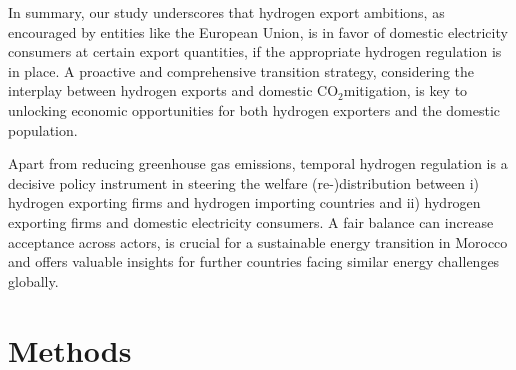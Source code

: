 \documentclass[5p,numafflabel]{elsarticle}
\newcommand{\co}{\ce{CO2}~}
\def\co{CO${}_2${\:}}
\begin{document}
In summary, our study underscores that hydrogen export ambitions, as encouraged by entities like the European Union, is in favor of domestic electricity consumers at certain export quantities, if the appropriate hydrogen regulation is in place. A proactive and comprehensive transition strategy, considering the interplay between hydrogen exports and domestic \co mitigation, is key to unlocking economic opportunities for both hydrogen exporters and the domestic population. 


Apart from reducing greenhouse gas emissions, temporal hydrogen regulation is a decisive policy instrument in steering the welfare (re-)distribution between i) hydrogen exporting firms and hydrogen importing countries and ii) hydrogen exporting firms and domestic electricity consumers. 
A fair balance can increase acceptance across actors, is crucial for a sustainable energy transition in Morocco and offers valuable insights for further countries facing similar energy challenges globally.


\section*{Methods}
\label{sec:methods}
\end{document}
